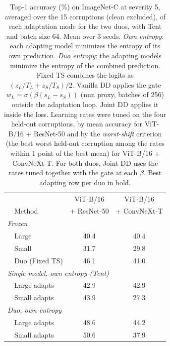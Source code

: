 \begin{table}[t]
    \centering
    \small
    \caption{Top-1 accuracy (\%) on ImageNet-C at severity 5, averaged over the 15 corruptions (clean excluded), of each adaptation mode for the two duos, with Tent and batch size 64. Mean over 3 seeds. \emph{Own entropy}: each adapting model minimizes the entropy of its own prediction. \emph{Duo entropy}: the adapting models minimize the entropy of the combined prediction. Fixed TS combines the logits as $(z_L / T_L + z_S / T_S)/2$. Vanilla DD applies the gate $w_L = \sigma(\beta(s_L - s_S))$ (nnn proxy, batches of 256) outside the adaptation loop. Joint DD applies it inside the loss. Learning rates were tuned on the four held-out corruptions, by mean accuracy for ViT-B/16 + ResNet-50 and by the \emph{worst-shift} criterion (the best worst held-out corruption among the rates within 1 point of the best mean) for ViT-B/16 + ConvNeXt-T. For both duos, Joint DD uses the rates tuned together with the gate at each $\beta$. Best adapting row per duo in bold.}
    \label{tab:adaptation_modes_avg:tent__vitb16_rn50v1_vs_vitb16_convnextt_gate}
    \begin{tabular}{llcc}
        \toprule
        & & ViT-B/16 & ViT-B/16 \\
        & Method & + ResNet-50 & + ConvNeXt-T \\
        \midrule
        \multicolumn{4}{l}{\textit{Frozen}} \\
        & Large & 40.4 & 40.4 \\
        & Small & 31.7 & 29.8 \\
        & Duo (Fixed TS) & 46.1 & 41.0 \\
        \midrule
        \multicolumn{4}{l}{\textit{Single model, own entropy (Tent)}} \\
        & Large adapts & 42.9 & 42.9 \\
        & Small adapts & 43.9 & 27.3 \\
        \midrule
        \multicolumn{4}{l}{\textit{Duo, own entropy}} \\
        & Large adapts & 48.6 & 44.2 \\
        & Small adapts & 50.6 & 37.9 \\

\end{tabular}
\end{table}
